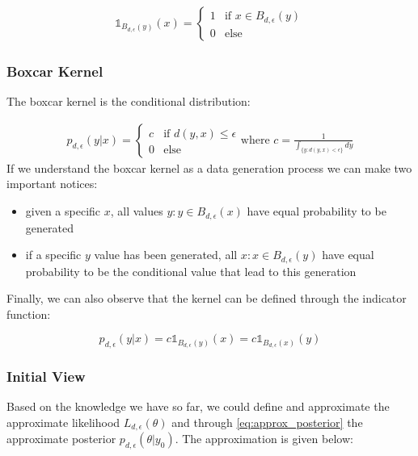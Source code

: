 \documentclass[11pt,twoside]{article}
\numberwithin{Theorem}{section}
\numberwithin{Definition}{section}
\numberwithin{Lemma}{section}
\numberwithin{Algorithm}{section}
\numberwithin{equation}{section}
\begin{document}
\begin{gather} \label{eq:indicator}
  \mathbb{1}_{B_{d,\epsilon}(y)}(x) = \left\{
	\begin{array}{ll}
		1 & \mbox{if } x \in B_{d,\epsilon}(y) \\
		0 & \mbox{else } 
	\end{array} \right. \end{gather}

\subsubsection*{Boxcar Kernel}

The boxcar kernel is the conditional distribution:

\begin{gather}
  p_{d,\epsilon}(y|x) = \left\{
	\begin{array}{ll}
		c  & \mbox{if } d(y,x) \leq \epsilon \\
		0 & \mbox{else } 
	\end{array}
  \right. \text{where } c = \frac{1}{\int_{ \{ y: d(y,x) < \epsilon\}} dy}
\end{gather}
%
If we understand the boxcar kernel as a data generation process we can make two important notices:

\begin{itemize}
\item given a specific $x$, all values $y: y \in B_{d,\epsilon}(x)$ have equal probability to be generated
  \item if a specific $y$ value has been generated, all $x: x \in B_{d,\epsilon}(y)$ have equal probability to be the conditional value that lead to this generation
  \end{itemize}
%
Finally, we can also observe that the kernel can be defined through the indicator function:

\begin{equation}
  p_{d,\epsilon}(y|x) = c \mathbb{1}_{B_{d,\epsilon}(y)}(x) = c \mathbb{1}_{B_{d,\epsilon}(x)}(y)
\end{equation}

\subsubsection*{Initial View}

Based on the knowledge we have so far, we could define and approximate the approximate likelihood $L_{d,\epsilon}(\theta)$ and through \ref{eq:approx_posterior} the approximate posterior $p_{d, \epsilon}(\theta|y_0)$. The approximation is given below:
\end{document}

